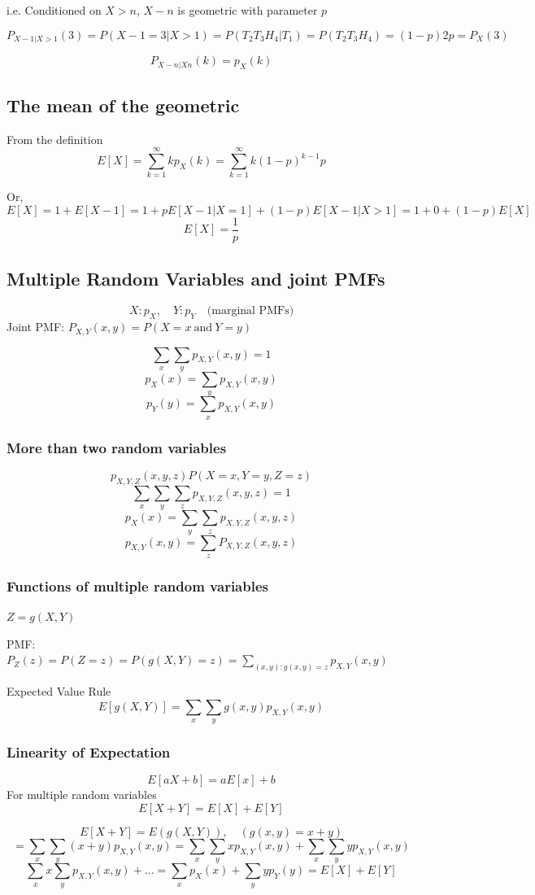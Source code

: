 \documentclass{article}
\begin{document}
i.e. Conditioned on \(X>n\), \(X-n\) is geometric with parameter \(p\)


\[
P_{X-1|X>1}(3) = P(X-1=3| X>1) = P(T_2T_3H_4 | T_1) = P(T_2T_3H_4) = (1-p)2p = P_X(3)
\]

\[
P_{X-n|Xn}(k) = p_X(k)
\]

\subsection*{The mean of the geometric}
From the definition
\[
E[X] = \sum_{k=1}^{\infty} kp_X(k) = \sum_{k=1}^{\infty} k(1-p)^{k-1}p
\]

Or,
\[
E[X] = 1 + E[X-1] = 1 + p E[X-1|X=1] + (1-p)E[X-1|X>1] = 1 + 0 + (1-p)E[X]
\]
\[
E[X] = \frac{1}{p}
\]

\subsection*{Multiple Random Variables and joint PMFs}
\[
X:p_X, \quad Y:p_Y \quad \text{(marginal PMFs)}
\]
Joint PMF: \(P_{X,Y}(x,y) = P(X=x \ \text{and} \ Y=y)\)

\[
\sum_x \sum_y p_{X,Y}(x,y) = 1
\]
\[
p_X(x) = \sum_y p_{X,Y}(x,y)
\]
\[
p_Y(y) = \sum_x p_{X,Y}(x,y)
\]

\subsubsection*{More than two random variables}
\[
p_{X,Y,Z}(x,y,z) P(X=x, Y=y, Z=z)
\]
\[
\sum_x \sum_y \sum_z p_{X,Y,Z}(x,y,z) = 1
\]
\[
p_X(x) = \sum_y \sum_z p_{X,Y,Z}(x,y,z)
\]
\[
p_{X,Y}(x,y) = \sum_z P_{X,Y,Z}(x,y,z)
\]

\subsubsection*{Functions of multiple random variables}
\(Z = g(X,Y)\)

PMF: \(P_Z(z) = P(Z=z) = P(g(X,Y) = z) = \sum_{(x,y): g(x,y) =z } p_{X,Y}(x,y)\)

Expected Value Rule
\[
E[g(X,Y)] = \sum_x \sum_y g(x,y) p_{X,Y}(x,y)
\]


\subsubsection*{Linearity of Expectation}
\[
E[aX + b] = aE[x] + b
\]
For multiple random variables
\[
E[X+Y] = E[X] + E[Y]
\]

\[
E[X+Y] = E(g(X,Y)), \quad (g(x,y) = x+y)
\]
\[
= \sum_x \sum_y (x+y)p_{X,Y}(x,y) = \sum_x \sum_y xp_{X,Y}(x,y) + \sum_x \sum_y yp_{X,Y}(x,y)
\]
\[
\sum_x x \sum_y p_{X,Y}(x,y) + \dots = \sum_x p_X(x) + \sum_y y p_Y(y) = E[X] + E[Y]
\]
\end{document}
